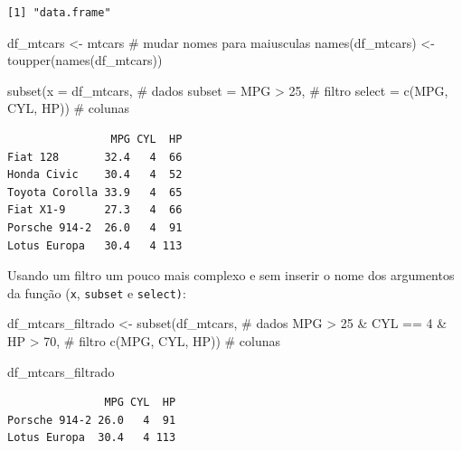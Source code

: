 \documentclass[
  letterpaper,
  DIV=11,
  numbers=noendperiod]{scrreprt}
\newenvironment{Shaded}{\begin{snugshade}}{\end{snugshade}}
\newcommand{\AttributeTok}[1]{\textcolor[rgb]{0.40,0.45,0.13}{#1}}
\newcommand{\CommentTok}[1]{\textcolor[rgb]{0.37,0.37,0.37}{#1}}
\newcommand{\DecValTok}[1]{\textcolor[rgb]{0.68,0.00,0.00}{#1}}
\newcommand{\FunctionTok}[1]{\textcolor[rgb]{0.28,0.35,0.67}{#1}}
\newcommand{\NormalTok}[1]{\textcolor[rgb]{0.00,0.23,0.31}{#1}}
\newcommand{\OtherTok}[1]{\textcolor[rgb]{0.00,0.23,0.31}{#1}}
\newcommand{\SpecialCharTok}[1]{\textcolor[rgb]{0.37,0.37,0.37}{#1}}
\begin{document}
\begin{verbatim}
[1] "data.frame"
\end{verbatim}

\begin{Shaded}
\begin{Highlighting}[]
\NormalTok{df\_mtcars }\OtherTok{\textless{}{-}}\NormalTok{ mtcars}
\CommentTok{\# mudar nomes para maiusculas}
\FunctionTok{names}\NormalTok{(df\_mtcars) }\OtherTok{\textless{}{-}} \FunctionTok{toupper}\NormalTok{(}\FunctionTok{names}\NormalTok{(df\_mtcars))}

\FunctionTok{subset}\NormalTok{(}\AttributeTok{x =}\NormalTok{ df\_mtcars, }\CommentTok{\# dados}
       \AttributeTok{subset =}\NormalTok{ MPG }\SpecialCharTok{\textgreater{}} \DecValTok{25}\NormalTok{, }\CommentTok{\# filtro  }
       \AttributeTok{select =} \FunctionTok{c}\NormalTok{(MPG, CYL, HP)) }\CommentTok{\# colunas}
\end{Highlighting}
\end{Shaded}

\begin{verbatim}
                MPG CYL  HP
Fiat 128       32.4   4  66
Honda Civic    30.4   4  52
Toyota Corolla 33.9   4  65
Fiat X1-9      27.3   4  66
Porsche 914-2  26.0   4  91
Lotus Europa   30.4   4 113
\end{verbatim}

Usando um filtro um pouco mais complexo e sem inserir o nome dos
argumentos da função (\texttt{x}, \texttt{subset} e \texttt{select)}:

\begin{Shaded}
\begin{Highlighting}[]
\NormalTok{df\_mtcars\_filtrado }\OtherTok{\textless{}{-}} \FunctionTok{subset}\NormalTok{(df\_mtcars, }\CommentTok{\# dados }
\NormalTok{       MPG }\SpecialCharTok{\textgreater{}} \DecValTok{25} \SpecialCharTok{\&}\NormalTok{ CYL }\SpecialCharTok{==} \DecValTok{4} \SpecialCharTok{\&}\NormalTok{ HP }\SpecialCharTok{\textgreater{}} \DecValTok{70}\NormalTok{, }\CommentTok{\# filtro  }
       \FunctionTok{c}\NormalTok{(MPG, CYL, HP)) }\CommentTok{\# colunas}

\NormalTok{df\_mtcars\_filtrado}
\end{Highlighting}
\end{Shaded}

\begin{verbatim}
               MPG CYL  HP
Porsche 914-2 26.0   4  91
Lotus Europa  30.4   4 113
\end{verbatim}
\end{document}
